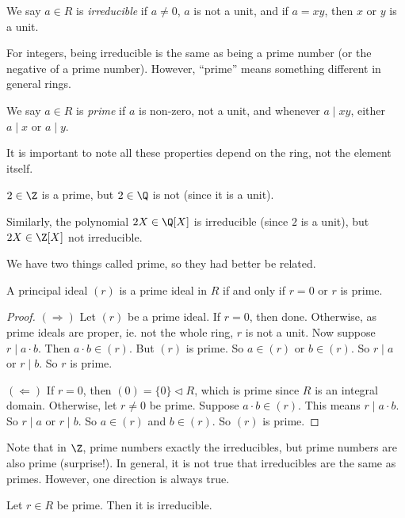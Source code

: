 \documentclass[a4paper]{article}
\begin{document}
\begin{defi}[Irreducible]
  We say $a \in R$ is \emph{irreducible} if $a \not = 0$, $a$ is not a unit, and if $a = xy$, then $x$ or $y$ is a unit.
\end{defi}
For integers, being irreducible is the same as being a prime number (or the negative of a prime number). However, ``prime'' means something different in general rings.

\begin{defi}[Prime]
  We say $a \in R$ is \emph{prime} if $a$ is non-zero, not a unit, and whenever $a \mid xy$, either $a \mid x$ or $a \mid y$.
\end{defi}
It is important to note all these properties depend on the ring, not the element itself.
\begin{eg}
  $2 \in \Z$ is a prime, but $2 \in \Q$ is not (since it is a unit).

  Similarly, the polynomial $2X \in \Q[X]$ is irreducible (since $2$ is a unit), but $2X \in \Z[X]$ not irreducible.
\end{eg}

We have two things called prime, so they had better be related.
\begin{lemma}
  A principal ideal $(r)$ is a prime ideal in $R$ if and only if $r = 0$ or $r$ is prime.
\end{lemma}

\begin{proof}
  $(\Rightarrow)$ Let $(r)$ be a prime ideal. If $r = 0$, then done. Otherwise, as prime ideals are proper, ie. not the whole ring, $r$ is not a unit. Now suppose $r \mid a \cdot b$. Then $a\cdot b \in (r)$. But $(r)$ is prime. So $a \in (r)$ or $b\in (r)$. So $r \mid a$ or $r \mid b$. So $r$ is prime.

  $(\Leftarrow)$ If $r = 0$, then $(0) = \{0\} \lhd R$, which is prime since $R$ is an integral domain. Otherwise, let $r \not= 0$ be prime. Suppose $a \cdot b \in (r)$. This means $r \mid a\cdot b$. So $r\mid a$ or $r \mid b$. So $a \in (r)$ and $b\in (r)$. So $(r)$ is prime.
\end{proof}

Note that in $\Z$, prime numbers exactly the irreducibles, but prime numbers are also prime (surprise!). In general, it is not true that irreducibles are the same as primes. However, one direction is always true.

\begin{lemma}
  Let $r \in R$ be prime. Then it is irreducible.
\end{lemma}
\end{document}

